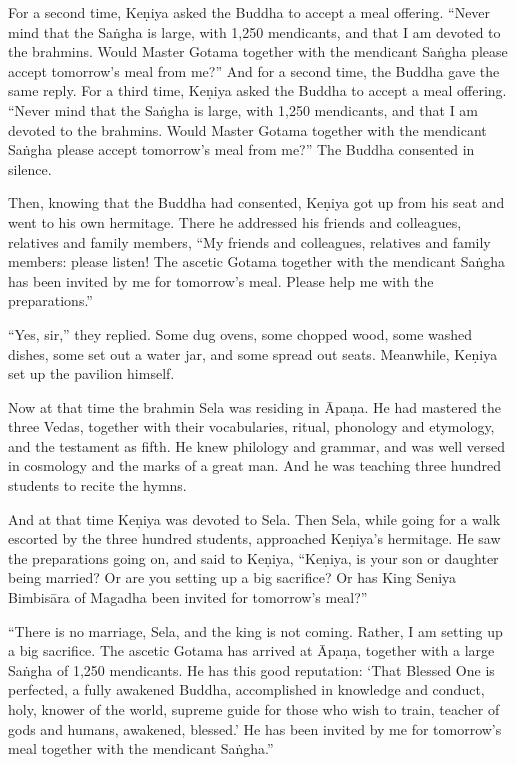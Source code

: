 \documentclass[12pt,openany]{book}%
\begin{document}
For a second time, \textsanskrit{Keṇiya} asked the Buddha to accept a meal offering. “Never mind that the \textsanskrit{Saṅgha} is large, with 1,250 mendicants, and that I am devoted to the brahmins. Would Master Gotama together with the mendicant \textsanskrit{Saṅgha} please accept tomorrow’s meal from me?” And for a second time, the Buddha gave the same reply. For a third time, \textsanskrit{Keṇiya} asked the Buddha to accept a meal offering. “Never mind that the \textsanskrit{Saṅgha} is large, with 1,250 mendicants, and that I am devoted to the brahmins. Would Master Gotama together with the mendicant \textsanskrit{Saṅgha} please accept tomorrow’s meal from me?” The Buddha consented in silence. 

Then, knowing that the Buddha had consented, \textsanskrit{Keṇiya} got up from his seat and went to his own hermitage. There he addressed his friends and colleagues, relatives and family members, “My friends and colleagues, relatives and family members: please listen! The ascetic Gotama together with the mendicant \textsanskrit{Saṅgha} has been invited by me for tomorrow’s meal. Please help me with the preparations.” 

“Yes, sir,” they replied. Some dug ovens, some chopped wood, some washed dishes, some set out a water jar, and some spread out seats. Meanwhile, \textsanskrit{Keṇiya} set up the pavilion himself. 

Now at that time the brahmin Sela was residing in \textsanskrit{Āpaṇa}. He had mastered the three Vedas, together with their vocabularies, ritual, phonology and etymology, and the testament as fifth. He knew philology and grammar, and was well versed in cosmology and the marks of a great man. And he was teaching three hundred students to recite the hymns. 

And at that time \textsanskrit{Keṇiya} was devoted to Sela. Then Sela, while going for a walk escorted by the three hundred students, approached \textsanskrit{Keṇiya}’s hermitage. He saw the preparations going on, and said to \textsanskrit{Keṇiya}, “\textsanskrit{Keṇiya}, is your son or daughter being married? Or are you setting up a big sacrifice? Or has King Seniya \textsanskrit{Bimbisāra} of Magadha been invited for tomorrow’s meal?” 

“There is no marriage, Sela, and the king is not coming. Rather, I am setting up a big sacrifice. The ascetic Gotama has arrived at \textsanskrit{Āpaṇa}, together with a large \textsanskrit{Saṅgha} of 1,250 mendicants. He has this good reputation: ‘That Blessed One is perfected, a fully awakened Buddha, accomplished in knowledge and conduct, holy, knower of the world, supreme guide for those who wish to train, teacher of gods and humans, awakened, blessed.’ He has been invited by me for tomorrow’s meal together with the mendicant \textsanskrit{Saṅgha}.” 
\end{document}

